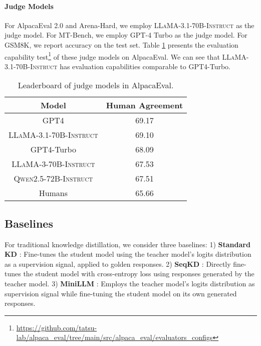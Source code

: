 \paragraph{Judge Models} For AlpacaEval 2.0 and Arena-Hard, we employ \textsc{LLaMA-3.1-70B-Instruct} as the judge model. For MT-Bench, we employ GPT-4 Turbo as the judge model. For GSM8K, we report accuracy on the test set. Table \ref{tab:judge} presents the evaluation capability test\footnote{\url{https://github.com/tatsu-lab/alpaca_eval/tree/main/src/alpaca_eval/evaluators_configs}} of these judge models on AlpacaEval. We can see that \textsc{LLaMA-3.1-70B-Instruct} has evaluation capabilities comparable to GPT4-Turbo.

\begin{table}[!tp]
\small
\centering
\setlength{\tabcolsep}{0.6em}
\renewcommand{\arraystretch}{1.3}
\begin{tabular}{cc}
\hline
\textbf{Model} & \textbf{Human Agreement} \\ \hline
GPT4 & 69.17  \\ 
\textsc{LLaMA-3.1-70B-Instruct} & 69.10  \\ 
GPT4-Turbo & 68.09 \\
\textsc{LLaMA-3-70B-Instruct} & 67.53  \\ 
\textsc{Qwen2.5-72B-Instruct} & 67.51 \\\hline
Humans & 65.66 \\
\hline
\end{tabular}
\caption{Leaderboard of judge models in AlpacaEval.}
\label{tab:judge}
\end{table}

\subsection{Baselines}
\label{app:baseline}
For traditional knowledge distillation, we consider three baselines: 1) \textbf{Standard KD} \citep{hinton2015distill}: Fine-tunes the student model using the teacher model's logits distribution as a supervision signal, applied to golden responses.
2) \textbf{SeqKD} \citep{kim-rush-2016-sequence}: Directly fine-tunes the student model with cross-entropy loss using responses generated by the teacher model.
3) \textbf{MiniLLM} \citep{gu-2024-minillm}: Employs the teacher model's logits distribution as supervision signal while fine-tuning the student model on its own generated responses.

